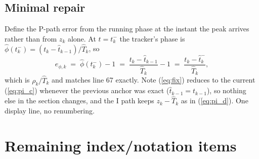 \documentclass[11pt]{article}
\newcommand{\Th}{\widehat{T}}
\newcommand{\tht}{\widehat{t}}
\newcommand{\ph}{\widehat{\phi}}
\begin{document}
\subsection{Minimal repair}

Define the P-path error from the running phase at the instant the peak arrives rather than
from $z_k$ alone. At $t=t_k^-$ the tracker's phase is
$\ph(t_k^-) = (t_k-\tht_{k-1})/\Th_k$, so
\begin{equation}
e_{\phi,k} \;=\; \ph(t_k^-) - 1 \;=\; \frac{t_k - \tht_{k-1}}{\Th_k} - 1
            \;=\; \frac{t_k - \tht_k^-}{\Th_k},
\label{eq:fix}
\end{equation}
which is $\rho_k/\Th_k$ and matches line 67 exactly. Note (\ref{eq:fix}) reduces to the
current (\ref{eq:pi_c}) whenever the previous anchor was exact ($\tht_{k-1}=t_{k-1}$), so
nothing else in the section changes, and the I path keeps $z_k-\Th_k$ as in
(\ref{eq:pi_d}). One display line, no renumbering.

\section{Remaining index/notation items}
\label{sec:nits}
\end{document}
